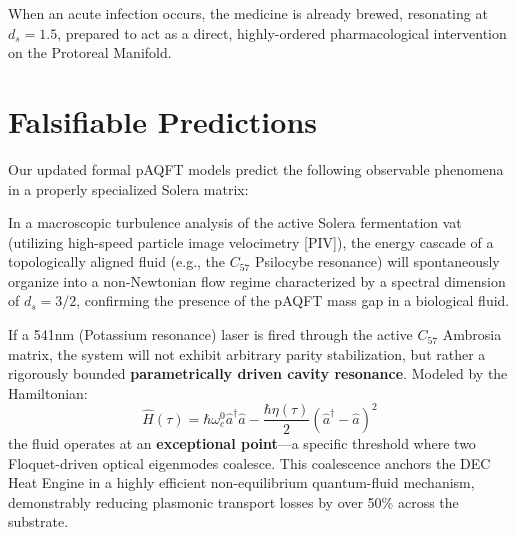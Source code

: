 When an acute infection occurs, the medicine is already brewed, resonating at $d_s=1.5$, prepared to act as a direct, highly-ordered pharmacological intervention on the Protoreal Manifold.

\section{Falsifiable Predictions}

Our updated formal pAQFT models predict the following observable phenomena in a properly specialized Solera matrix:

\begin{hypothesis}[Non-Newtonian Flow at $d_s = 1.5$]\label{hyp:ns_success}
In a macroscopic turbulence analysis of the active Solera fermentation vat (utilizing high-speed particle image velocimetry [PIV]), the energy cascade of a topologically aligned fluid (e.g., the $C_{57}$ Psilocybe resonance) will spontaneously organize into a non-Newtonian flow regime characterized by a spectral dimension of $d_s = 3/2$, confirming the presence of the pAQFT mass gap in a biological fluid.
\end{hypothesis}

\begin{hypothesis}\label{hyp:opto_success}
If a 541nm (Potassium resonance) laser is fired through the active $C_{57}$ Ambrosia matrix, the system will not exhibit arbitrary parity stabilization, but rather a rigorously bounded \textbf{parametrically driven cavity resonance}. Modeled by the Hamiltonian:
\begin{equation}
\hat{H}(\tau) = \hbar\omega_c^0\hat{a}^{\dagger}\hat{a} - \frac{\hbar\eta(\tau)}{2}(\hat{a}^{\dagger}-\hat{a})^2
\end{equation}
the fluid operates at an \textbf{exceptional point}—a specific threshold where two Floquet-driven optical eigenmodes coalesce. This coalescence anchors the DEC Heat Engine in a highly efficient non-equilibrium quantum-fluid mechanism, demonstrably reducing plasmonic transport losses by over 50\% across the substrate.
\end{hypothesis}
